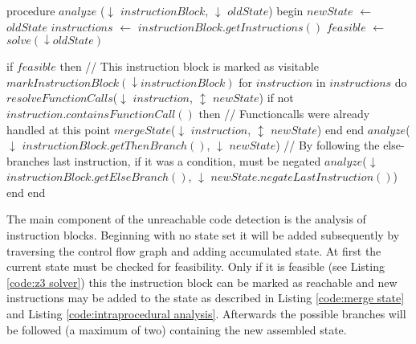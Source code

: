 \begin{program}[h!]
	\begin{GenericCode}
	procedure $analyze$ ($\downarrow$ $instructionBlock$, $\downarrow$ $oldState$) begin
		$newState$ $\leftarrow$ $oldState$
		$instructions$ $\leftarrow$ $instructionBlock.getInstructions()$
		$feasible$ $\leftarrow$ $solve(\downarrow oldState)$
		
		if $feasible$ then
			// This instruction block is marked as visitable
			$markInstructionBlock(\downarrow instructionBlock)$ 
			for $instruction$ in $instructions$ do
				$resolveFunctionCalls$($\downarrow$ $instruction$, $\updownarrow$ $newState$)	
				if not $instruction.containsFunctionCall()$ then
					// Functioncalls were already handled at this point
					$mergeState$($\downarrow$ $instruction$, $\updownarrow$ $newState$)
				end 
			end
			$analyze$($\downarrow$ $instructionBlock.getThenBranch()$, $\downarrow$ $newState$)
			// By following the else-branches last instruction, if it was a condition, must be negated
			$analyze$($\downarrow$ $instructionBlock.getElseBranch()$, $\downarrow$ $newState.negateLastInstruction()$)
		end
	end	
	\end{GenericCode}

	\caption{The main component of the unreachable code detection is the analysis of instruction blocks. Beginning with no state set it will be added subsequently by traversing the control flow graph and adding accumulated state. 
	At first the current state must be checked for feasibility. Only if it is feasible (see Listing \ref{code:z3 solver}) this the instruction block can be marked as reachable and new instructions may be added to the state as described in Listing \ref{code:merge state} and Listing \ref{code:intraprocedural analysis}.	
	Afterwards the possible branches will be followed (a maximum of two) containing the new assembled state.}
	\label{code:instruction block analyzer}
\end{program}

